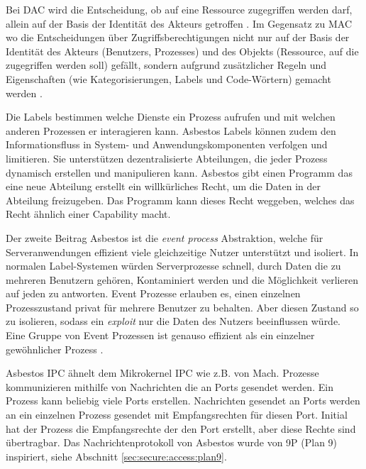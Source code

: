 \documentclass[11pt,technote]{IEEEtran}
\begin{document}
      Bei DAC wird die Entscheidung, ob auf eine Ressource zugegriffen werden darf, allein auf der Basis der Identität des Akteurs getroffen \cite{Url:dac}.      
      Im Gegensatz zu MAC wo die Entscheidungen über Zugriffsberechtigungen nicht nur auf der Basis der Identität des Akteurs 
      (Benutzers, Prozesses) und des Objekts (Ressource, auf die zugegriffen     
      werden soll) gefällt, sondern aufgrund zusätzlicher Regeln und Eigenschaften (wie Kategorisierungen, Labels und Code-Wörtern) gemacht werden \cite{Url:mac}.
      
      Die Labels bestimmen welche Dienste ein Prozess aufrufen und mit welchen anderen Prozessen er interagieren kann. 
      Asbestos Labels k\"onnen zudem den Informationsfluss in System- und Anwendungskomponenten verfolgen und limitieren.
      Sie unterst\"utzen dezentralisierte Abteilungen, die jeder Prozess dynamisch erstellen und manipulieren kann.
      Asbestos gibt einen Programm das eine neue Abteilung erstellt ein willk\"urliches Recht, um die Daten in der Abteilung freizugeben.
      Das Programm kann dieses Recht weggeben, welches das Recht \"ahnlich einer Capability macht.
      
      Der zweite Beitrag Asbestos ist die \textit{event process} Abstraktion, welche f\"ur Serveranwendungen 
      effizient viele gleichzeitige Nutzer unterst\"utzt und isoliert.
      In normalen Label-Systemen w\"urden Serverprozesse schnell, durch Daten die zu mehreren Benutzern geh\"oren, Kontaminiert werden und die 
      M\"oglichkeit verlieren auf jeden zu antworten. Event Prozesse erlauben es, einen einzelnen Prozesszustand privat f\"ur mehrere Benutzer zu behalten.
      Aber diesen Zustand so zu isolieren, sodass ein \textit{exploit} nur die Daten des Nutzers beeinflussen w\"urde.
      Eine Gruppe von Event Prozessen ist genauso effizient als ein einzelner gew\"ohnlicher Prozess \cite[S. 1]{inproc:asbestos}.
      
      Asbestos IPC \"ahnelt dem Mikrokernel IPC wie z.B. von Mach. Prozesse kommunizieren mithilfe von Nachrichten die an Ports gesendet werden. Ein Prozess kann
      beliebig viele Ports erstellen. Nachrichten gesendet an Ports werden an ein einzelnen Prozess gesendet mit Empfangsrechten f\"ur diesen Port. 
      Initial hat der Prozess
      die Empfangsrechte der den Port erstellt, aber diese Rechte sind \"ubertragbar. Das Nachrichtenprotokoll von Asbestos wurde von 9P (Plan 9) inspiriert,
      siehe Abschnitt \ref{sec:secure:access:plan9}.      
      
\end{document}
